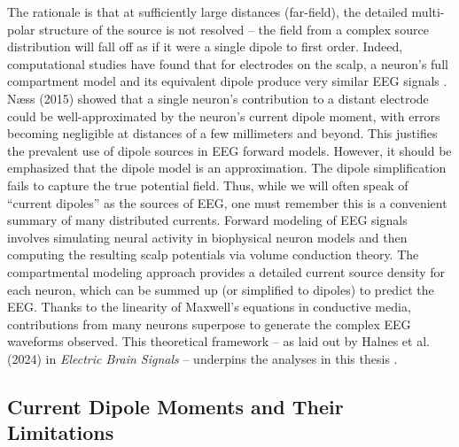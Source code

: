 \documentclass[final, a4paper,masters,en,listoffigures,listoftables,norwegiandates]{NMBU}
\begin{document}
The rationale is that at sufficiently large distances (far-field), the detailed multi-polar structure of the source is not resolved – the field from a complex source distribution will fall off as if it were a single dipole to first order. Indeed, computational studies have found that for electrodes on the scalp, a neuron’s full compartment model and its equivalent dipole produce very similar EEG signals \cite{Næss2015}. Næss (2015) showed that a single neuron’s contribution to a distant electrode could be well-approximated by the neuron’s current dipole moment, with errors becoming negligible at distances of a few millimeters and beyond. This justifies the prevalent use of dipole sources in EEG forward models. However, it should be emphasized that the dipole model is an approximation. The dipole simplification fails to capture the true potential field. Thus, while we will often speak of “current dipoles” as the sources of EEG, one must remember this is a convenient summary of many distributed currents. 
Forward modeling of EEG signals involves simulating neural activity in biophysical neuron models and then computing the resulting scalp potentials via volume conduction theory. The compartmental modeling approach provides a detailed current source density for each neuron, which can be summed up (or simplified to dipoles) to predict the EEG. Thanks to the linearity of Maxwell’s equations in conductive media, contributions from many neurons superpose to generate the complex EEG waveforms observed. This theoretical framework – as laid out by Halnes et al. (2024) in \textit{Electric Brain Signals} – underpins the analyses in this thesis \cite{Halnes2024ElectricBrainSignals}.

\subsection{Current Dipole Moments and Their Limitations} \label{subsec: CDM limitations}
\end{document}
